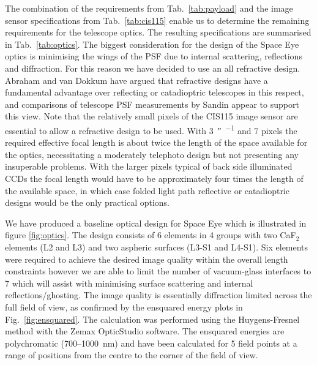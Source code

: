 \documentclass[]{iac}
\begin{document}
The combination of the requirements from Tab.~\ref{tab:payload} and the image sensor specifications from
Tab.~\ref{tab:cis115} enable us to determine the remaining requirements for the telescope optics. The resulting
specifications are summarised in Tab.~\ref{tab:optics}. The biggest consideration for the design of the Space Eye optics
is minimising the wings of the PSF due to internal scattering, reflections and diffraction. For this reason we have
decided to use an all refractive design. Abraham and van Dokkum\cite{Abraham2014} have argued that refractive designs
have a fundamental advantage over reflecting or catadioptric telescopes in this respect, and comparisons of telescope
PSF measurements by Sandin\cite{Sandin2014} appear to support this view. Note that the relatively small pixels of the
CIS115 image sensor are essential to allow a refractive design to be used. With \SI{3}{\arcsecond\per\pix} and
\SI{7}{\micron} pixels the required effective focal length is about twice the length of the space available for the
optics, necessitating a moderately telephoto design but not presenting any insuperable problems. With the larger pixels
typical of back side illuminated CCDs the focal length would have to be approximately four times the length of the
available space, in which case folded light path reflective or catadioptric designs would be the only practical options.

We have produced a baseline optical design for Space Eye which is illustrated in figure \ref{fig:optics}. The design
consists of 6 elements in 4 groups with two CaF$_2$ elements (L2 and L3) and two aspheric surfaces (L3-S1 and L4-S1).
Six elements were required to achieve the desired image quality within the overall length constraints however we are
able to limit the number of vacuum-glass interfaces to 7 which will assist with minimising surface scattering and
internal reflections/ghosting. The image quality is essentially diffraction limited across the full field of view, as
confirmed by the ensquared energy plots in Fig.~\ref{fig:ensquared}. The calculation was performed using the
Huygens-Fresnel method with the Zemax OpticStudio software. The ensquared energies are polychromatic
(700--\SI{1000}{\nano\metre}) and have been calculated for 5 field points at a range of positions from the centre to the
corner of the field of view.
\end{document}

